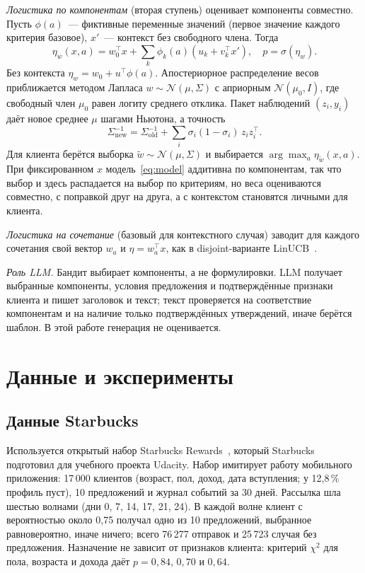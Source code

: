 \documentclass{misisarticle}
\begin{document}
\textit{Логистика по компонентам} (вторая ступень) оценивает компоненты совместно. Пусть $\phi(a)$~--- фиктивные переменные значений (первое значение каждого критерия базовое), $x'$~--- контекст без свободного члена. Тогда
\begin{equation}
  \eta_w(x, a) = w_0^{\top} x + \sum_{k} \phi_k(a) \left(u_k + v_k^{\top} x'\right), \quad p = \sigma(\eta_w).
  \label{eq:model}
\end{equation}
Без контекста $\eta_w = w_0 + u^{\top}\phi(a)$. Апостериорное распределение весов приближается методом Лапласа $w \sim \mathcal{N}(\mu, \Sigma)$ с априорным $\mathcal{N}(\mu_0, I)$, где свободный член $\mu_0$ равен логиту среднего отклика. Пакет наблюдений $(z_i, y_i)$ даёт новое среднее $\mu$ шагами Ньютона, а точность
\begin{equation}
  \Sigma_{\mathrm{new}}^{-1} = \Sigma_{\mathrm{old}}^{-1} + \sum_{i} \sigma_i (1 - \sigma_i)\, z_i z_i^{\top}.
  \label{eq:update}
\end{equation}
Для клиента берётся выборка $\tilde w \sim \mathcal{N}(\mu, \Sigma)$ и выбирается $\arg\max_a \eta_{\tilde w}(x, a)$. При фиксированном $x$ модель~\eqref{eq:model} аддитивна по компонентам, так что выбор и здесь распадается на выбор по критериям, но веса оцениваются совместно, с поправкой друг на друга, а с контекстом становятся личными для клиента.

\textit{Логистика на сочетание} (базовый для контекстного случая) заводит для каждого сочетания свой вектор $w_a$ и $\eta = w_a^{\top} x$, как в disjoint-варианте LinUCB~\cite{li2010}.

\textit{Роль LLM.} Бандит выбирает компоненты, а не формулировки. LLM получает выбранные компоненты, условия предложения и подтверждённые признаки клиента и пишет заголовок и текст; текст проверяется на соответствие компонентам и на наличие только подтверждённых утверждений, иначе берётся шаблон. В этой работе генерация не оценивается.

\section{Данные и эксперименты}

\subsection{Данные Starbucks}

Используется открытый набор Starbucks Rewards~\cite{starbucks}, который Starbucks подготовил для учебного проекта Udacity. Набор имитирует работу мобильного приложения: 17\,000 клиентов (возраст, пол, доход, дата вступления; у 12,8\,\% профиль пуст), 10 предложений и журнал событий за 30 дней. Рассылка шла шестью волнами (дни 0, 7, 14, 17, 21, 24). В каждой волне клиент с вероятностью около 0,75 получал одно из 10 предложений, выбранное равновероятно, иначе ничего; всего 76\,277 отправок и 25\,723 случая без предложения. Назначение не зависит от признаков клиента: критерий $\chi^2$ для пола, возраста и дохода даёт $p = 0{,}84$, $0{,}70$ и $0{,}64$.
\end{document}
